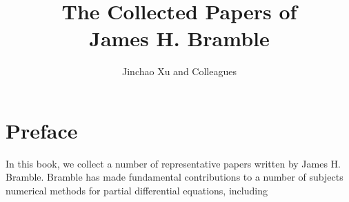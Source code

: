 \documentclass[leqno,labelfig,psfigt,colorlinks]{svmono}
\begin{document}
\title{The Collected Papers of \\\textbf{James H. Bramble}}
\author{Jinchao Xu and Colleagues}
\maketitle
%	
\tableofcontents

%

\chapter*{Preface}
In this book, we collect a number of representative papers written by
James H. Bramble.   Bramble has made fundamental contributions to a
number of subjects numerical methods for partial differential
equations, including




%








%
\end{document}
